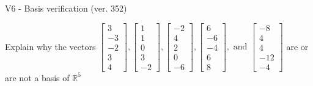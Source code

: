 \begin{exercise}
  \begin{exerciseTitle}V6 - Basis verification (ver. 352)\end{exerciseTitle}
  \begin{exerciseStatement}
    Explain why the vectors \(\left[\begin{array}{r}
3 \\
-3 \\
-2 \\
3 \\
4
\end{array}\right] , \left[\begin{array}{r}
1 \\
1 \\
0 \\
3 \\
-2
\end{array}\right] , \left[\begin{array}{r}
-2 \\
4 \\
2 \\
0 \\
-6
\end{array}\right] , \left[\begin{array}{r}
6 \\
-6 \\
-4 \\
6 \\
8
\end{array}\right] , \text{ and } \left[\begin{array}{r}
-8 \\
4 \\
4 \\
-12 \\
-4
\end{array}\right]\) are or are not a basis of \(\mathbb{R}^5\)	



\end{exerciseStatement}
\end{exercise}
